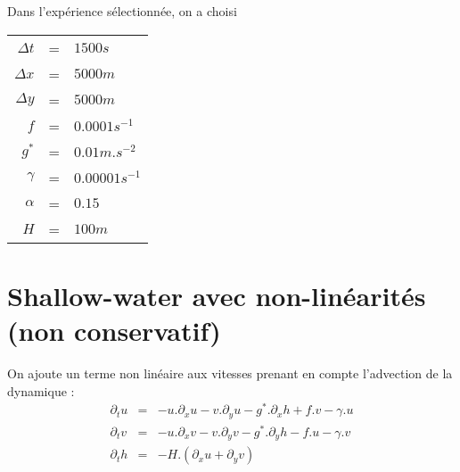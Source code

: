 \documentclass[a4paper,12pt]{article}
\begin{document}
Dans l'expérience sélectionnée, on a choisi

\begin{tabular}{rcl}
$\Delta t$ & = & $1500 s$ \\
$\Delta x$ & = & $5000 m$ \\
$\Delta y$ & = & $5000 m$ \\
$f$ & = & $0.0001 s^{-1}$\\
$g^*$& = & $0.01 m.s^{-2}$\\
$\gamma$& = & $0.00001s^{-1}$ \\
$\alpha$& = & $0.15$\\
$H$& = & $100 m$ \\

\end{tabular}
\iffalse
\section{Shallow-water avec non-linéarités (non conservatif)}
On ajoute un terme non linéaire aux vitesses prenant en compte l'advection de la dynamique :
\begin{eqnarray}
\partial_tu & = & -u.\partial_xu - v.\partial_yu - g^*.\partial_xh + f . v - \gamma . u \nonumber \\
\partial_tv & = & -u.\partial_xv - v.\partial_yv - g^*.\partial_yh - f . u - \gamma . v \label{shal-nonlin-noncs}\\
\partial_th & = & - H.(\partial_xu + \partial_yv) \nonumber
\end{eqnarray}
\end{document}
